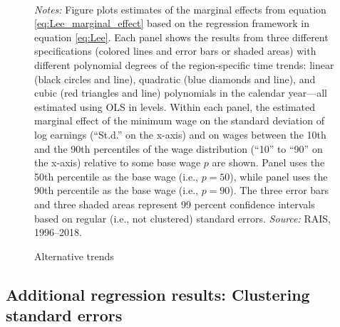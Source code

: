 \begin{figure}[!htb]
  \centering
  \caption{\label{app_fig_alt_trends}Alternative trends}
  \prefigvspace
  \hspace*{\fill}%
  \centerhfill[\qquad\qquad\qquad\qquad\qquad]
  \hspace*{\fill}
  \\
  \postfigvspace
  \begin{minipage}[t]{1\columnwidth}%
    \begin{spacing}{0.75}
      \emph{\scriptsize{}Notes:}{\scriptsize{} Figure plots estimates of the marginal effects from equation \eqref{eq:Lee_marginal_effect} based on the regression framework in equation \eqref{eq:Lee}. Each panel shows the results from three different specifications (colored lines and error bars or shaded areas) with different polynomial degrees of the region-specific time trends: linear (black circles and line), quadratic (blue diamonds and line), and cubic (red triangles and line) polynomials in the calendar year---all estimated using OLS in levels. Within each panel, the estimated marginal effect of the minimum wage on the standard deviation of log earnings (``St.d.'' on the x-axis) and on wages between the 10th and the 90th percentiles of the wage distribution (``10'' to ``90'' on the x-axis) relative to some base wage $p$ are shown. Panel  uses the 50th percentile as the base wage (i.e., $p=50$), while panel  uses the 90th percentile as the base wage (i.e., $p=90$). The three error bars and three shaded areas represent 99 percent confidence intervals based on regular (i.e., not clustered) standard errors. %
      \emph{\scriptsize{}Source: } RAIS, 1996--2018.}
    \end{spacing}
  \end{minipage}
\end{figure}




\clearpage
\subsection{Additional regression results: Clustering standard errors\label{app_subsec:lee_regressions_cluster}}

